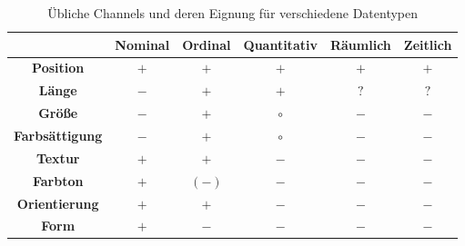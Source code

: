 				\begin{table}
					\centering
					\begin{tabular}{c|ccccc}
						\toprule
						                       & \textbf{Nominal} & \textbf{Ordinal} & \textbf{Quantitativ} & \textbf{Räumlich} & \textbf{Zeitlich} \\ \midrule
						  \textbf{Position}    &      \(+\)       &      \(+\)       &        \(+\)         &       \(+\)       &       \(+\)       \\
						    \textbf{Länge}     &      \(-\)       &      \(+\)       &        \(+\)         &       \(?\)       &       \(?\)       \\
						    \textbf{Größe}     &      \(-\)       &      \(+\)       &      \(\circ\)       &       \(-\)       &       \(-\)       \\
						\textbf{Farbsättigung} &      \(-\)       &      \(+\)       &      \(\circ\)       &       \(-\)       &       \(-\)       \\
						   \textbf{Textur}     &      \(+\)       &      \(+\)       &        \(-\)         &       \(-\)       &       \(-\)       \\
						   \textbf{Farbton}    &      \(+\)       &     \((-)\)      &        \(-\)         &       \(-\)       &       \(-\)       \\
						\textbf{Orientierung}  &      \(+\)       &      \(+\)       &        \(-\)         &       \(-\)       &       \(-\)       \\
						    \textbf{Form}      &      \(+\)       &      \(-\)       &        \(-\)         &       \(-\)       &       \(-\)       \\ \bottomrule
					\end{tabular}
					\caption{Übliche Channels und deren Eignung für verschiedene Datentypen}
					\label{tab:channelsDatentypen}
				\end{table}
